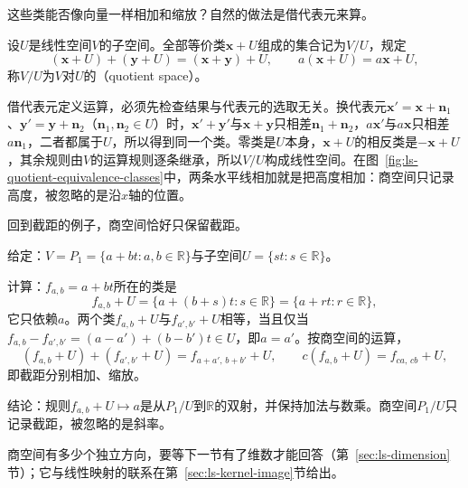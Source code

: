 这些类能否像向量一样相加和缩放？自然的做法是借代表元来算。
\begin{definition}[商空间]
\label{def:linear-algebra-quotient-space}
设$U$是线性空间$V$的子空间。全部等价类$\bm x+U$组成的集合记为$V/U$，规定
\[
 (\bm x+U)+(\bm y+U)=(\bm x+\bm y)+U,
 \qquad
 a(\bm x+U)=a\bm x+U,
\]
称$V/U$为$V$对$U$的（quotient space）。
\end{definition}
借代表元定义运算，必须先检查结果与代表元的选取无关。换代表元$\bm x'=\bm x+\bm n_1$、$\bm y'=\bm y+\bm n_2$（$\bm n_1,\bm n_2\in U$）时，$\bm x'+\bm y'$与$\bm x+\bm y$只相差$\bm n_1+\bm n_2$，$a\bm x'$与$a\bm x$只相差$a\bm n_1$，二者都属于$U$，所以得到同一个类。零类是$U$本身，$\bm x+U$的相反类是$-\bm x+U$，其余规则由$V$的运算规则逐条继承，所以$V/U$构成线性空间。在图~\ref{fig:ls-quotient-equivalence-classes}中，两条水平线相加就是把高度相加：商空间只记录高度，被忽略的是沿$x$轴的位置。

回到截距的例子，商空间恰好只保留截距。
\begin{example}[只保留截距的商空间]
\label{ex:ls-quotient-intercept}
给定：$V=P_1=\{a+bt:a,b\in\mathbb R\}$与子空间$U=\{st:s\in\mathbb R\}$。

计算：$f_{a,b}=a+bt$所在的类是
\[
 f_{a,b}+U=\{a+(b+s)t:s\in\mathbb R\}=\{a+rt:r\in\mathbb R\},
\]
它只依赖$a$。两个类$f_{a,b}+U$与$f_{a',b'}+U$相等，当且仅当$f_{a,b}-f_{a',b'}=(a-a')+(b-b')t\in U$，即$a=a'$。按商空间的运算，
\[
 (f_{a,b}+U)+(f_{a',b'}+U)=f_{a+a',\,b+b'}+U,
 \qquad
 c(f_{a,b}+U)=f_{ca,\,cb}+U,
\]
即截距分别相加、缩放。

结论：规则$f_{a,b}+U\mapsto a$是从$P_1/U$到$\mathbb R$的双射，并保持加法与数乘。商空间$P_1/U$只记录截距，被忽略的是斜率。
\end{example}
商空间有多少个独立方向，要等下一节有了维数才能回答（第~\ref{sec:ls-dimension}节）；它与线性映射的联系在第~\ref{sec:ls-kernel-image}节给出。
